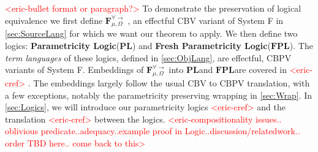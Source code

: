 \documentclass[acmsmall]{acmart}
\newcommand{\eric}[1]{\textcolor{red}{ <eric-#1> }}
\newcommand{\source}{$\mathbf{F}_{\mu,\Omega}^{\forall\to}\;$}
\newcommand{\pl}{$\mathbf{PL}$}
\newcommand{\fpl}{$\mathbf{FPL}$}
\begin{document}
\eric{bullet format or paragraph?}
 To demonstrate the preservation of logical equivalence we first define \source, an effectful CBV variant of System F in \cref{sec:SourceLang} for which we want our theorem to apply. We then define two logics: \textbf{Parametricity Logic}(\pl) and \textbf{Fresh Parametricity Logic}(\fpl). The \textit{term languages} of these logics, defined in \cref{sec:ObjLang}, are effectful, CBPV \cite{CBPV} variants of System F. Embeddings of \source into \pl and \fpl are covered in \eric{cref}. The embeddings largely follow the usual\cite{CBPV} CBV to CBPV translation, with a few exceptions, notably the parametricity preserving wrapping in \cref{sec:Wrap}. In \cref{sec:Logics}, we will introduce our parametricity logics\eric{cref} and the translation \eric{cref} between the logics.
 \eric{compositionality issues.. oblivious predicate..adequacy..example proof in Logic..discussion/relatedwork.. order TBD here.. come back to this}







\begin{comment}
\subsubsection{Gradual Typing with Fresh Quantification}

To illustrate this, we will consider a polymorphic Call-by-push-value \eric{cite} calculus with an extensible sum type denoted $OSum$ which we use to represent the dynamic type Dyn. In order to inject a value, $V:A$, into $OSum$, we need a $Case$ symbol associated with the type $A$. Case symbols are representative of the runtime type tags of the dynamic type and can be dynamically allocated by the expression $new_A : F(Case\;A)$. The introduction from of the extensible sum type, $inj_\sigma\;V : OSum$ uses a case symbol $\sigma : Case\;A$ to store a value $V:A$. The elimination form, $rec_{OSum}\;(inj_\sigma\;V),\sigma'\;\{x.\;M\;|\;N\}$, compares the case symbol $\sigma$ used to inject the value into $OSum$ to a given case symbol $\sigma'$. When the case symbols match, the value stored in $OSum$ is bound to $x$ in the continuation $M$. Otherwise, we proceed with the default case $N$. Assuming a preallocated set of case symbols $\sigma_\mathbb{B} : Case\;\mathbb{B},\sigma_\times : Case\;(OSum \times OSum),\sigma_\to : Case\;(OSum \to OSum),...$, we can encode the example above as:
$$t : \forall X.Case\;X \to X \to F\mathbb{B} := \Lambda X. \lambda \sigma_X.\lambda x.rec_{OSum}\;(inj_{\sigma_X}x),\sigma_\mathbb{B}\;\{x.\;ret\;x\;|\;\Omega\}$$
\\
\\
\end{comment}
\end{document}
